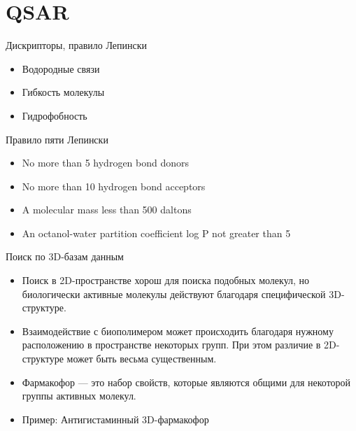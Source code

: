 \section{QSAR}

\begin{frame}{Дискрипторы, правило Лепински}
    \begin{itemize}
        \item Водородные связи
        \item Гибкость молекулы
        \item Гидрофобность
     \end{itemize}        
     \vspace{0.5cm}
     {\Large Правило пяти Лепински}
    \begin{itemize}
        \item No more than 5 hydrogen bond donors 
        \item No more than 10 hydrogen bond acceptors 
        \item A molecular mass less than 500 daltons
        \item An octanol-water partition coefficient log P not greater than 5
     \end{itemize}        
\end{frame}

\begin{frame}{Поиск по 3D-базам данным}
	\begin{itemize}
		\item			 Поиск в 2D-пространстве хорош для поиска подобных  молекул, но биологически активные молекулы действуют благодаря специфической 3D-структуре.
		\item			Взаимодействие с биополимером может происходить благодаря нужному расположению в пространстве некоторых  групп. При этом различие в 2D-структуре может быть весьма существенным.
		\item			   Фармакофор — это набор свойств, которые являются общими для некоторой группы активных молекул.
		\item			    Пример:  Антигистаминный   3D-фармакофор 
	\end{itemize}

	\begin{center}
        \tiny
	\end{center}
\end{frame}

